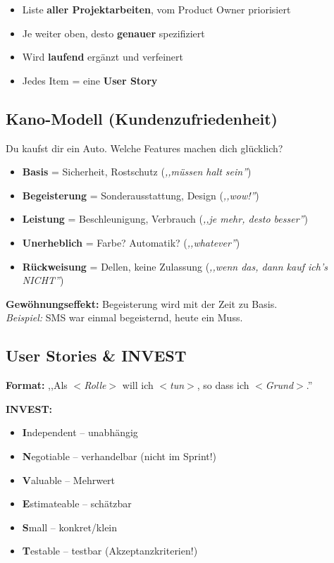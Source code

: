 \documentclass[11pt,a4paper]{article}
\begin{document}
\begin{keyfacts}
\begin{itemize}
  \item Liste \textbf{aller Projektarbeiten}, vom Product Owner priorisiert
  \item Je weiter oben, desto \textbf{genauer} spezifiziert
  \item Wird \textbf{laufend} ergänzt und verfeinert
  \item Jedes Item = eine \textbf{User Story}
\end{itemize}
\end{keyfacts}

\subsection{Kano-Modell (Kundenzufriedenheit)}

\begin{story}
Du kaufst dir ein Auto. Welche Features machen dich glücklich?
\begin{itemize}
  \item \textbf{Basis} = Sicherheit, Rostschutz (\emph{,,müssen halt sein''})
  \item \textbf{Begeisterung} = Sonderausstattung, Design (\emph{,,wow!''})
  \item \textbf{Leistung} = Beschleunigung, Verbrauch (\emph{,,je mehr, desto besser''})
  \item \textbf{Unerheblich} = Farbe? Automatik? (\emph{,,whatever''})
  \item \textbf{Rückweisung} = Dellen, keine Zulassung (\emph{,,wenn das, dann kauf ich's NICHT''})
\end{itemize}
\end{story}

\begin{merkhilfe}
\textbf{Gewöhnungseffekt:} Begeisterung wird mit der Zeit zu Basis.\\
\emph{Beispiel:} SMS war einmal begeisternd, heute ein Muss.
\end{merkhilfe}

\subsection{User Stories \& INVEST}

\begin{keyfacts}
\textbf{Format:} ,,Als \emph{$<$Rolle$>$} will ich \emph{$<$tun$>$}, so dass ich \emph{$<$Grund$>$}.''

\textbf{INVEST:}
\begin{itemize}
  \item \textbf{I}ndependent -- unabhängig
  \item \textbf{N}egotiable -- verhandelbar (nicht im Sprint!)
  \item \textbf{V}aluable -- Mehrwert
  \item \textbf{E}stimateable -- schätzbar
  \item \textbf{S}mall -- konkret/klein
  \item \textbf{T}estable -- testbar (Akzeptanzkriterien!)
\end{itemize}
\end{keyfacts}
\end{document}
